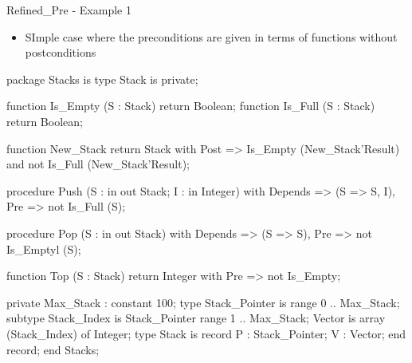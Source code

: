 \documentclass{beamer}
\begin{document}
\begin{frame}{Refined\_Pre - Example 1}

  \begin{itemize}

    \item SImple case where the preconditions are given in terms of
      functions without postconditions
  \end{itemize}

  \begin{pxcode}[language=SPARK,style=tinystyle,gobble=4]
    package Stacks
    is
       type Stack is private;
 
       function Is_Empty (S : Stack) return Boolean;
       function Is_Full (S : Stack) return Boolean;

       function New_Stack return Stack
       with Post => Is_Empty (New_Stack'Result) and 
                             not Is_Full (New_Stack'Result);

       procedure Push (S : in out Stack; I : in Integer)
          with Depends => (S => S, I),
                  Pre         => not Is_Full (S);

       procedure Pop (S : in out Stack)
          with Depends => (S => S),
                  Pre         => not Is_Emptyl (S);

       function Top (S : Stack) return Integer
           with Pre => not Is_Empty;

    private
        Max_Stack : constant 100;
        type Stack_Pointer is range 0 .. Max_Stack;
        subtype Stack_Index is Stack_Pointer range 1 .. Max_Stack;
        Vector is array (Stack_Index) of Integer; 
        type Stack is record
            P : Stack_Pointer;
            V : Vector;
         end record;
    end Stacks;
          
 \end{pxcode}

\end{frame}
\end{document}
